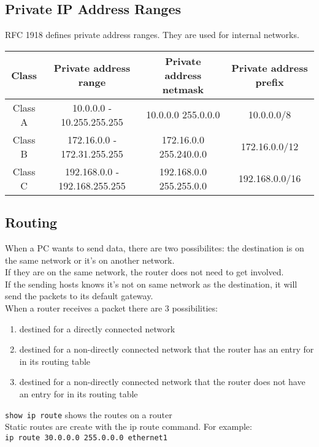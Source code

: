 \subsection{Private IP Address Ranges}

RFC 1918 defines private address ranges. They are used for internal networks.\\

\begin{tabular}{ | c | c | c | c | }
\hline
Class & Private address range & Private address netmask & Private address prefix \\ \hline
Class A & 10.0.0.0 - 10.255.255.255 & 10.0.0.0 255.0.0.0 & 10.0.0.0/8 \\ \hline
Class B & 172.16.0.0 - 172.31.255.255 & 172.16.0.0 255.240.0.0 & 172.16.0.0/12 \\ \hline
Class C & 192.168.0.0 - 192.168.255.255 & 192.168.0.0 255.255.0.0 & 192.168.0.0/16 \\ \hline
\end{tabular}

\subsection{Routing}

When a PC wants to send data, there are two possibilites: the destination
is on the same network or it's on another network.\\

If they are on the same network, the router does not need to get involved.\\

If the sending hosts knows it's not on same network as the destination, it will
send the packets to its default gateway.\\

When a router receives a packet there are 3 possibilities:

\begin{enumerate}

\item destined for a directly connected network
\item destined for a non-directly connected network that the router has an
entry for in its routing table
\item destined for a non-directly connected network that the router does not
have an entry for in its routing table

\end{enumerate}

\texttt{show ip route} shows the routes on a router\\

Static routes are create with the ip route command. For example:\\

\texttt{ip route 30.0.0.0 255.0.0.0 ethernet1}\\


